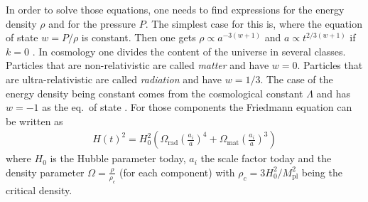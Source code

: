 \documentclass[twoside,a4paper, 12pt]{article}
\numberwithin{equation}{section}
\begin{document}
\noindent
In order to solve those equations, one needs to find expressions
for the energy density $\rho$ and for the pressure $P$.
The simplest case for this is, where the equation of state $w = P / \rho$ is constant.
Then one gets $\rho \propto a^{-3(w + 1)}$ \cite[Eq. 3.36]{TheEarlyUniverseKolbAndTurner} and $a \propto t^{2/3(w + 1)}$ if $k = 0$ \cite[Eq. 3.37]{TheEarlyUniverseKolbAndTurner}.
In cosmology one divides the content of the universe in several classes.
Particles that are non-relativistic are called \emph{matter} and have $w = 0$.
Particles that are ultra-relativistic are called \emph{radiation} and have $w = 1/3$.
The case of the energy density being constant comes from the cosmological constant $\Lambda$ and has $w = -1$ as
the eq.\ of state \cite[Eq. 3.7]{TheEarlyUniverseKolbAndTurner}.
For those components the Friedmann equation can be written as
\cite[Eq. 9]{FriedmannPaper}
\begin{align}
    \label{eq:hubble_parameter_evo}
    H(t)^2 = H_0^2 \left(
        \Omega_\mathrm{rad} \left( \frac{a_i}{a} \right)^4 +
        \Omega_\mathrm{mat} \left( \frac{a_i}{a} \right)^3
    \right)
\end{align}
where $H_0$ is the Hubble parameter today, $a_i$ the scale factor today and the density parameter $\Omega = \frac{\rho}{\rho_c}$ (for each component) with $\rho_c = 3 H_0^2 / M_\mathrm{pl}^2$ being the critical density.
\end{document}
